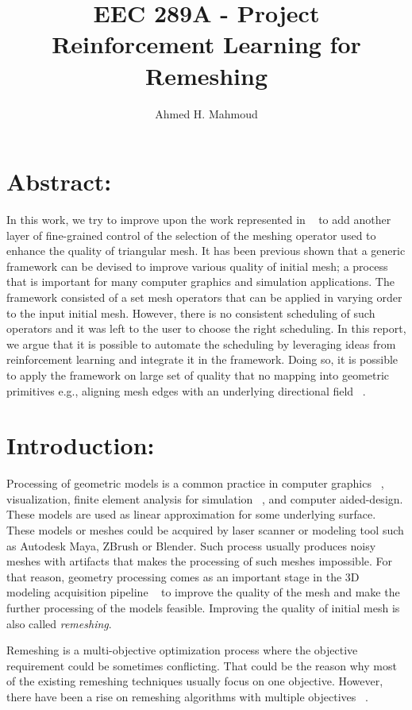 \documentclass[a4paper,10pt]{article}
\title{EEC 289A - Project \\ Reinforcement Learning for Remeshing}
\author{Ahmed H. Mahmoud}
\date{}
\begin{document}
\maketitle

\section{Abstract:}
In this work, we try to improve upon the work represented in ~\citep{Abdelkader:2017:ACR} to add another layer of fine-grained control of the selection of the meshing operator used to enhance the quality of triangular mesh. It has been previous shown that a generic framework can be devised to improve various quality of initial mesh; a process that is important for many computer graphics and simulation applications. The framework consisted of a set mesh operators that can be applied in varying order to the input initial mesh. However, there is no consistent scheduling of such operators and it was left to the user to choose the right scheduling. In this report, we argue that it is possible to automate the scheduling by leveraging ideas from reinforcement learning and integrate it in the framework. Doing so, it is possible to apply the framework on large set of quality that no mapping into geometric primitives e.g., aligning mesh edges with an underlying directional field ~\cite{Jakob:2015:IFM:2816795.2818078}. 


\section{Introduction:}
Processing of geometric models is a common practice in computer graphics ~\citep{Alliez2008}, visualization, finite element analysis for simulation ~\citep{ho1988finite}, and computer aided-design. These models are used as linear approximation for some underlying surface. These models or meshes could be acquired by laser scanner or modeling tool such as Autodesk Maya, ZBrush or Blender. Such process usually produces noisy meshes with artifacts that makes the processing of such meshes impossible. For that reason, geometry processing comes as an important stage in the 3D modeling acquisition pipeline ~\citep{CGF:CGF00574} to improve the quality of the mesh and make the further processing of the models feasible. Improving the quality of initial mesh is also called \emph{remeshing}.

Remeshing is a multi-objective optimization process where the objective requirement could be sometimes conflicting. That could be the reason why most of the existing remeshing techniques usually focus on one objective. However, there have been a rise on remeshing algorithms with multiple objectives ~\citep{7756294, field, Jakob:2015:IFM:2816795.2818078}. 
\end{document}
